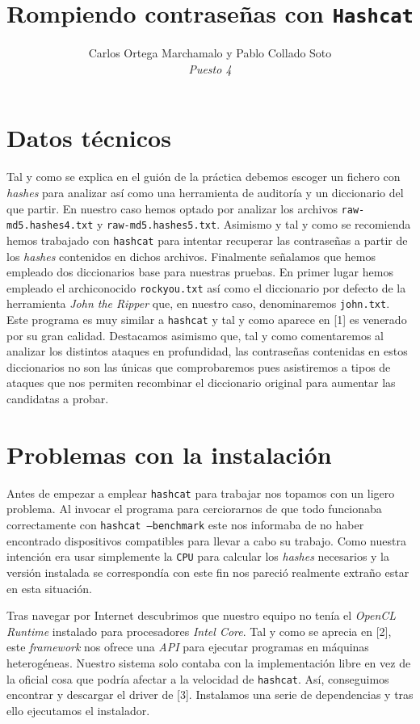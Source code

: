 \documentclass{article}
\title{Rompiendo contraseñas con \texttt{Hashcat}}
\author{Carlos Ortega Marchamalo y Pablo Collado Soto \\ \textit{Puesto 4}}
\date{}
\begin{document}
    \maketitle

    \section{Datos técnicos}
        Tal y como se explica en el guión de la práctica debemos escoger un fichero con \textit{hashes} para analizar así como una herramienta de auditoría y un diccionario del que partir. En nuestro caso hemos optado por analizar los archivos \texttt{raw-md5.hashes4.txt} y \texttt{raw-md5.hashes5.txt}. Asimismo y tal y como se recomienda hemos trabajado con \texttt{hashcat} para intentar recuperar las contraseñas a partir de los \textit{hashes} contenidos en dichos archivos. Finalmente señalamos que hemos empleado dos diccionarios base para nuestras pruebas. En primer lugar hemos empleado el archiconocido \texttt{rockyou.txt} así como el diccionario por defecto de la herramienta \textit{John the Ripper} que, en nuestro caso, denominaremos \texttt{john.txt}. Este programa es muy similar a \texttt{hashcat} y tal y como aparece en [1] es venerado por su gran calidad. Destacamos asimismo que, tal y como comentaremos al analizar los distintos ataques en profundidad, las contraseñas contenidas en estos diccionarios no son las únicas que comprobaremos pues asistiremos a tipos de ataques que nos permiten recombinar el diccionario original para aumentar las candidatas a probar.

    \section{Problemas con la instalación}
        Antes de empezar a emplear \texttt{hashcat} para trabajar nos topamos con un ligero problema. Al invocar el programa para cerciorarnos de que todo funcionaba correctamente con \texttt{hashcat --benchmark} este nos informaba de no haber encontrado dispositivos compatibles para llevar a cabo su trabajo. Como nuestra intención era usar simplemente la \texttt{CPU} para calcular los \textit{hashes} necesarios y la versión instalada se correspondía con este fin nos pareció realmente extraño estar en esta situación.

        Tras navegar por Internet descubrimos que nuestro equipo no tenía el \textit{OpenCL Runtime} instalado para procesadores \textit{Intel Core}. Tal y como se aprecia en [2], este \textit{framework} nos ofrece una \textit{API} para ejecutar programas en máquinas heterogéneas. Nuestro sistema solo contaba con la implementación libre en vez de la oficial cosa que podría afectar a la velocidad de \texttt{hashcat}. Así, conseguimos encontrar y descargar el driver de [3]. Instalamos una serie de dependencias y tras ello ejecutamos el instalador.
\end{document}
